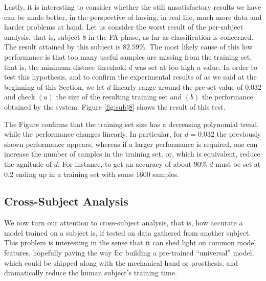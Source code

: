 \documentclass[10pt]{bmc_article}
\def\texttt{[image: ]}
\newenvironment{bmcformat}{\begin{raggedright}\baselineskip20pt\sloppy\setboolean{publ}{false}}{\end{raggedright}\baselineskip20pt\sloppy}
\begin{document}
\begin{bmcformat}
Lastly, it is interesting to consider whether the still unsatisfactory
results we have can be made better, in the perspective of having, in
real life, much more data and harder problems at hand. Let us consider
the worst result of the per-subject analysis, that is, subject $8$ in
the FA phase, as far as classification is concerned. The result
attained by this subject is $82.59\%$. The most likely cause of this
low performance is that too many useful samples are missing from the
training set, that is, the minimum distace threshold $d$ was set at
too high a value. In order to test this hypothesis, and to confirm the
experimental results of
\cite{2008.BioCyb} as we said at the beginning of this Section, we
let $d$ linearly range around the pre-set value of $0.032$ and check
$(a)$ the size of the resulting training set and $(b)$ the performance
obtained by the system. Figure \ref{fig:subj8} shows the result of
this test.


The Figure confirms that the training set size has a decreasing
polynomial trend, while the performance changes linearly. In
particular, for $d=0.032$ the previously shown performance appears,
whereas if a larger performance is required, one can increase the
number of samples in the training set, or, which is equivalent, reduce
the agnitude of $d$. For instance, to get an accuracy of about $90\%$
$d$ must be set at $0.2$ ending up in a training set with some $1600$
samples.

\subsection*{Cross-Subject Analysis}

We now turn our attention to cross-subject analysis, that is, how
accurate a model trained on a subject is, if tested on data gathered
from another subject. This problem is interesting in the sense that it
can shed light on common model features, hopefully paving the way for
building a pre-trained ``universal'' model, which could be shipped
along with the mechanical hand or prosthesis, and dramatically reduce
the human subject's training time.


\end{bmcformat}
\end{document}
